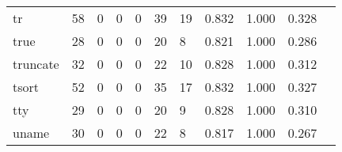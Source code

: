 \begin{longtable}{lp{1.2cm}p{1.2cm}p{1.2cm}p{1.2cm}p{1.2cm}p{1.2cm}p{1.2cm}p{1.2cm}p{1.2cm}p{1.2cm}}
tr        &                                    58 &                                                  0 &                                                  0 &                                                  0 &                                                 39 &                                                 19 &                                              0.832 &                                              1.000 &                                              0.328 \\
true      &                                    28 &                                                  0 &                                                  0 &                                                  0 &                                                 20 &                                                  8 &                                              0.821 &                                              1.000 &                                              0.286 \\
truncate  &                                    32 &                                                  0 &                                                  0 &                                                  0 &                                                 22 &                                                 10 &                                              0.828 &                                              1.000 &                                              0.312 \\
tsort     &                                    52 &                                                  0 &                                                  0 &                                                  0 &                                                 35 &                                                 17 &                                              0.832 &                                              1.000 &                                              0.327 \\
tty       &                                    29 &                                                  0 &                                                  0 &                                                  0 &                                                 20 &                                                  9 &                                              0.828 &                                              1.000 &                                              0.310 \\
uname     &                                    30 &                                                  0 &                                                  0 &                                                  0 &                                                 22 &                                                  8 &                                              0.817 &                                              1.000 &                                              0.267 \\

\end{longtable}
